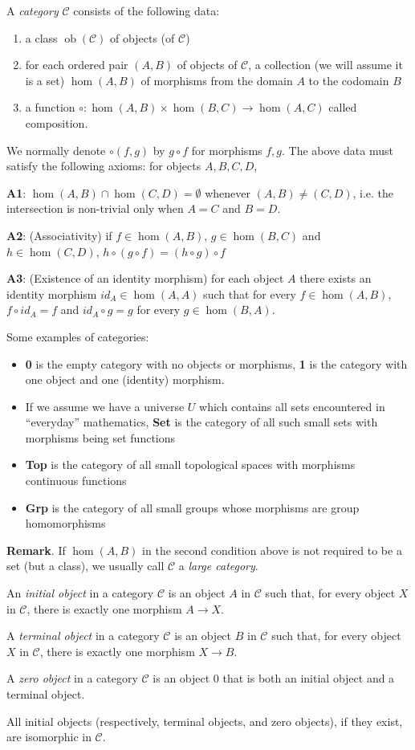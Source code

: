 A \emph{category} $\mathcal{C}$ consists of the following data:
\begin{enumerate}
\item a class $\operatorname{ob}(\mathcal{C})$ of objects (of $\mathcal{C}$)
\item for each ordered pair $(A,B)$ of objects of $\mathcal{C}$, a collection (we will assume it is
 a set) $\hom(A,B)$ of morphisms from the domain $A$ to the codomain $B$
\item a function $\circ:\hom(A,B)\times\hom(B,C)\to\hom(A,C)$ called composition.
\end{enumerate}

We normally denote $\circ(f,g)$ by $g \circ f$ for morphisms $f,g$. The above data must satisfy the following axioms: for objects $A,B,C,D$,

\textbf{A1}: $\hom(A,B) \cap \hom(C,D)=\emptyset$ whenever $(A,B)\neq (C,D)$, i.e. the intersection is non-trivial only when $A=C$ and $B=D$.

\textbf{A2}: (Associativity) if $f \in \hom(A,B)$, $g\in\hom(B,C)$ and $h\in\hom(C,D)$, $h\circ (g\circ f)=(h\circ g)\circ f$

\textbf{A3}: (Existence of an identity morphism) for each object $A$ there exists an identity morphism $ {}id_{A}\in\hom(A,A)$ such that for every $f\in\hom(A,B)$, $f\circ id_{A}=f$ and $ {}id_{A}\circ g=g$ for every $g \in \hom(B,A)$.

Some examples of categories:
\begin{itemize}
\item \textbf{0} is the empty category with no objects or morphisms, \textbf{1} is the category with one object and one (identity) morphism.
\item If we assume we have a universe $U$ which contains all sets encountered in ``everyday'' mathematics,
\textbf{Set} is the category of all such small sets with morphisms being set functions
\item \textbf{Top} is the category of all small topological spaces with morphisms continuous functions 
\item \textbf{Grp} is the category of all small groups whose morphisms are group homomorphisms 
\end{itemize}

\textbf{Remark}.  If $\hom(A,B)$ in the second condition above is not required to be a set (but a class), we usually call $\mathcal{C}$ a \emph{large category}.

An {\em initial object} in a category $\mathcal{C}$ is an object $A$ in $\mathcal{C}$ such that, for every object $X$ in $\mathcal{C}$, there is exactly one morphism $A \longrightarrow X$.

A {\em terminal object} in a category $\mathcal{C}$ is an object $B$ in $\mathcal{C}$ such that, for every object $X$ in $\mathcal{C}$, there is exactly one morphism $X \longrightarrow B$.

A {\em zero object} in a category $\mathcal{C}$ is an object $0$ that is both an initial object and a terminal object.

All initial objects (respectively, terminal objects, and zero objects), if they exist, are isomorphic in $\mathcal{C}$.